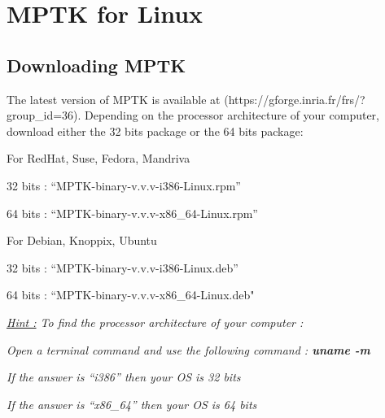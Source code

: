 \chapter{MPTK for Linux \label{MptkForLin}}

\section{Downloading MPTK}

The latest version of MPTK is available at (https://gforge.inria.fr/frs/?group\_id=36). Depending on the processor 
architecture of your computer, download either the 32 bits package or the 64 bits package:
\begin{my_itemize}
	\item For RedHat, Suse, Fedora, Mandriva 
	\begin{my_itemize}
		\item 32 bits : ``MPTK-binary-v.v.v-i386-Linux.rpm''
		\item 64 bits : ``MPTK-binary-v.v.v-x86\_64-Linux.rpm''
	\end{my_itemize}
	\item For Debian, Knoppix, Ubuntu 
	\begin{my_itemize}
		\item 32 bits : ``MPTK-binary-v.v.v-i386-Linux.deb''
		\item 64 bits : ``MPTK-binary-v.v.v-x86\_64-Linux.deb"
	\end{my_itemize}
\end{my_itemize}

\noindent \emph{\underline{Hint :} To find the processor architecture of your computer :}
\begin{my_itemize}
	\item \emph{Open a terminal command and use the following command : \textbf{uname -m}}
	\begin{my_itemize}
		\item \emph{If the answer is ``i386'' then your OS is 32 bits}
		\item \emph{If the answer is ``x86\_64'' then your OS is 64 bits}
	\end{my_itemize}
\end{my_itemize}

